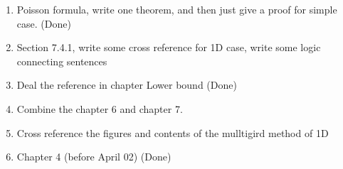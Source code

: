 \begin{enumerate}
\item Poisson formula, write one theorem, and then just give a proof for simple case. (Done)
\item Section 7.4.1, write some cross reference for 1D case, write some logic connecting sentences
\item  Deal the reference in chapter Lower bound (Done)
\item  Combine the chapter 6 and chapter 7. 
\item Cross reference the figures and contents of the mulltigird method of 1D
\item Chapter 4 (before April 02) (Done)
\end{enumerate}